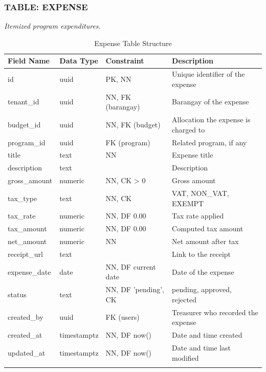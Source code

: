 \subsubsection*{TABLE: EXPENSE}
\noindent\textit{Itemized program expenditures.}
\begin{longtable}{|p{3.2cm}|p{2.2cm}|p{3.2cm}|p{5.4cm}|}
\hline
\textbf{Field Name} & \textbf{Data Type} & \textbf{Constraint} & \textbf{Description} \\ \hline
\endhead
\hline \endfoot
\hline \endlastfoot
id & uuid & PK, NN & Unique identifier of the expense \\ \hline
tenant\_id & uuid & NN, FK (barangay) & Barangay of the expense \\ \hline
budget\_id & uuid & NN, FK (budget) & Allocation the expense is charged to \\ \hline
program\_id & uuid & FK (program) & Related program, if any \\ \hline
title & text & NN & Expense title \\ \hline
description & text & & Description \\ \hline
gross\_amount & numeric & NN, CK > 0 & Gross amount \\ \hline
tax\_type & text & NN, CK & VAT, NON\_VAT, EXEMPT \\ \hline
tax\_rate & numeric & NN, DF 0.00 & Tax rate applied \\ \hline
tax\_amount & numeric & NN, DF 0.00 & Computed tax amount \\ \hline
net\_amount & numeric & NN & Net amount after tax \\ \hline
receipt\_url & text & & Link to the receipt \\ \hline
expense\_date & date & NN, DF current date & Date of the expense \\ \hline
status & text & NN, DF 'pending', CK & pending, approved, rejected \\ \hline
created\_by & uuid & FK (users) & Treasurer who recorded the expense \\ \hline
created\_at & timestamptz & NN, DF now() & Date and time created \\ \hline
updated\_at & timestamptz & NN, DF now() & Date and time last modified \\ \hline
\caption{Expense Table Structure}
\label{tab:expense}
\end{longtable}
\vspace{3mm}

